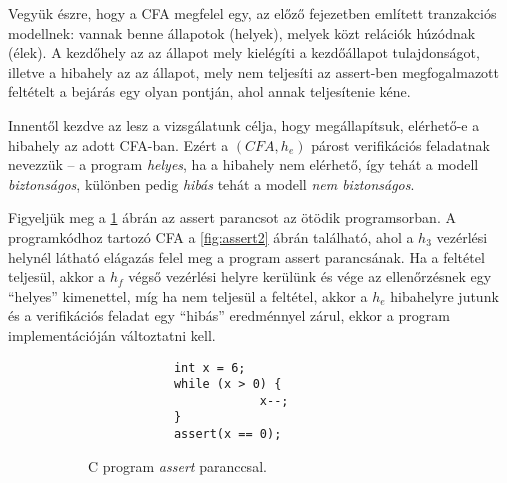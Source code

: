 Vegyük észre, hogy a CFA megfelel egy, az előző fejezetben említett tranzakciós modellnek: vannak benne állapotok (helyek), melyek közt relációk húzódnak (élek). A kezdőhely az az állapot mely kielégíti a kezdőállapot tulajdonságot, illetve a hibahely az az állapot, mely nem teljesíti az assert-ben megfogalmazott feltételt a bejárás egy olyan pontján, ahol annak teljesítenie kéne.

Innentől kezdve az lesz a vizsgálatunk célja, hogy megállapítsuk, elérhető-e a hibahely az adott CFA-ban. Ezért a $(\mathit{CFA}, h_e)$ párost verifikációs feladatnak nevezzük -- a program \emph{helyes}, ha a hibahely nem elérhető, így tehát a modell \textit{biztonságos}, különben pedig \emph{hibás} tehát a modell \textit{nem biztonságos}.
\ \\
\begin{example}
	Figyeljük meg a \ref{fig:assert1} ábrán az assert parancsot az ötödik programsorban. A programkódhoz tartozó CFA a \ref{fig:assert2} ábrán található, ahol a $h_3$ vezérlési helynél látható elágazás felel meg a program assert parancsának. Ha a feltétel teljesül, akkor a $h_f$ végső vezérlési helyre kerülünk és vége az ellenőrzésnek egy ``helyes'' kimenettel, míg ha nem teljesül a feltétel, akkor a $h_e$ hibahelyre jutunk és a verifikációs feladat egy ``hibás'' eredménnyel zárul, ekkor a program implementációján változtatni kell.
	\begin{figure}[!htb]
		\begin{subfigure}[b]{.43\linewidth}
			\begin{lstlisting}
			int x = 6;
			while (x > 0) {
						x--;
			}
			assert(x == 0);\end{lstlisting}
			\caption{C program \emph{assert} paranccsal.}
			\label{fig:assert1}		
		\end{subfigure}	
		\hfill
		\begin{subfigure}[b]{.56\linewidth}
			\centering
\end{subfigure}
\end{figure}
\end{example}
